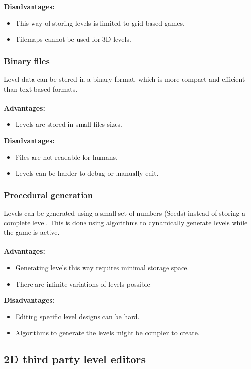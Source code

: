 \documentclass{article} %
\begin{document}
\noindent\textbf{Disadvantages:}
\begin{itemize}
	\item This way of storing levels is limited to grid-based games.
	\item Tilemaps cannot be used for 3D levels.
\end{itemize}

\subsubsection{Binary files}
Level data can be stored in a binary format, which is more compact and efficient than text-based formats.
\\\\
\textbf{Advantages:}
\begin{itemize}
	\item Levels are stored in small files sizes.
\end{itemize}
\noindent\textbf{Disadvantages:}
\begin{itemize}
	\item Files are not readable for humans.
	\item Levels can be harder to debug or manually edit.
\end{itemize}

\subsubsection{Procedural generation}
Levels can be generated using a small set of numbers (Seeds) instead of storing a complete level.
This is done using algorithms to dynamically generate levels while the game is active. 
\\\\
\textbf{Advantages:}
\begin{itemize}
	\item Generating levels this way requires minimal storage space.
	\item There are infinite variations of levels possible.
\end{itemize}
\noindent\textbf{Disadvantages:}
\begin{itemize}
	\item Editing specific level designs can be hard.
	\item Algorithms to generate the levels might be complex to create.
\end{itemize}

\subsection{2D third party level editors}
\end{document}
